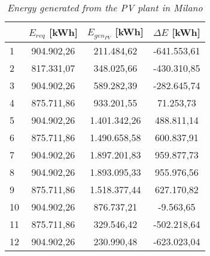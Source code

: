 \begin{table}[hp]
\centering
\begin{tabular}{|l|c|c|c|}
\hline
\rowcolor{bluepoli!40}\multicolumn{1}{|c|}{\textbf{Month}} & \textbf{$E_{req}$ [kWh]} & \textbf{$E_{gen_{PV}}$ [kWh]} & \textbf{$\Delta E$ [kWh]} \\ \hline
1                           & 904.902,26                    & 211.484,62              & -641.553,61               \\ \hline
2                           & 817.331,07                    & 348.025,66              & -430.310,85               \\ \hline
3                           & 904.902,26                    & 589.282,39              & -282.645,74               \\ \hline
4                           & 875.711,86                    & 933.201,55              & 71.253,73                 \\ \hline
5                           & 904.902,26                    & 1.401.342,26            & 488.811,14                \\ \hline
6                           & 875.711,86                    & 1.490.658,58            & 600.837,91                \\ \hline
7                           & 904.902,26                    & 1.897.201,83            & 959.877,73                \\ \hline
8                           & 904.902,26                    & 1.893.095,33            & 955.976,56                \\ \hline
9                           & 875.711,86                    & 1.518.377,44            & 627.170,82                \\ \hline
10                          & 904.902,26                    & 876.737,21              & -9.563,65                 \\ \hline
11                          & 875.711,86                    & 329.546,42              & -502.218,64               \\ \hline
12                          & 904.902,26                    & 230.990,48              & -623.023,04               \\ \hline
\end{tabular}
\caption{\textit{Energy generated from the PV plant in Milano}}
\label{tab:pvplantmilan}
\end{table}